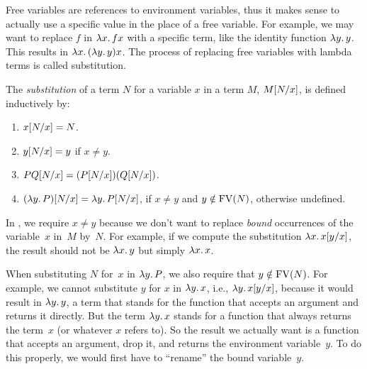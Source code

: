 \documentclass[../../../include/open-logic-section]{subfiles}
\begin{document}

\begin{explain}
Free variables are references to environment variables, thus it makes
sense to actually use a specific value in the place of a free
variable. For example, we may want to replace $f$ in $\lambd[x][f x]$
with a specific term, like the identity function $\lambd[y][y]$. This
results in $\lambd[x][(\lambd[y][y]) x]$. The process of replacing
free variables with lambda terms is called substitution.
\end{explain}

\begin{defn}[Substitution] 
  The \emph{substitution} of a term $N$ for a variable $x$ in a term
  $M$, $M[N/x]$, is defined inductively by:
  \begin{enumerate}
    \item $x[N/x] = N$.  
    \item $y[N/x]  = y$ if $x \neq y$.  
    \item $PQ[N/x]  = (P[N/x]) (Q[N/x])$.
    \item $\Subst{(\lambd[y][P])}{N}{x} = \lambd[y][\Subst{P}{N}{x}]$,
      if $x \neq y$ and $y \notin \mathrm{FV}({N})$, otherwise undefined.
  \end{enumerate}
\end{defn}

\begin{explain}
In , we require $x
\neq y$ because we don't want to replace \emph{bound} occurrences of
the variable~$x$ in~$M$ by~$N$.  For example, if we compute the
substitution $\Subst{\lambd[x][x]}{y}{x}$, the result should not be
$\lambd[x][y]$ but simply $\lambd[x][x]$.

When substituting $N$ for~$x$ in $\lambd[y][P]$, we also require that
$y \notin \mathrm{FV}({N})$.  For example, we cannot substitute $y$ for $x$ in
$\lambd[y][x]$, i.e., $\Subst{\lambd[y][x]}{y}{x}$, because it would
result in $\lambd[y][y]$, a term that stands for the function that
accepts an argument and returns it directly. But the term
$\lambd[y][x]$ stands for a function that always returns the term~$x$
(or whatever $x$ refers to). So the result we actually want is a
function that accepts an argument, drop it, and returns the
environment variable~$y$. To do this properly, we would first have to
``rename'' the bound variable~$y$.
\end{explain}
\end{document}
